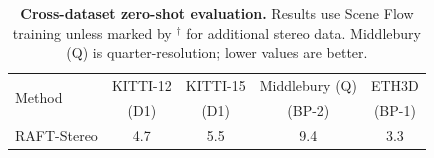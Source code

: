 \begin{table}[!t]
	\centering
	\small
		\begin{minipage}{0.59\textwidth}
			\centering
			\small
			\setlength{\tabcolsep}{3.0pt}
			\renewcommand{\arraystretch}{1.05}
			\vspace{-12pt}
			\caption{\textbf{Cross-dataset zero-shot evaluation.}
			Results use Scene Flow training unless marked by $^{\dagger}$ for additional stereo data.
			Middlebury (Q) is quarter-resolution; lower values are better.}
			\label{tab:dispvit_zero_shot}
			\vspace{2pt}
			\begin{tabular}{@{}lcccc@{}}
				\toprule
				\multirow{2}{*}{Method} & KITTI-12 & KITTI-15 & Middlebury (Q) & ETH3D\\
				& (D1) & (D1) & (BP-2) & (BP-1)\\
				\midrule
				
				RAFT-Stereo & 4.7 & 5.5 & 9.4 & 3.3\\
				

\end{tabular}
\end{minipage}
\end{table}
